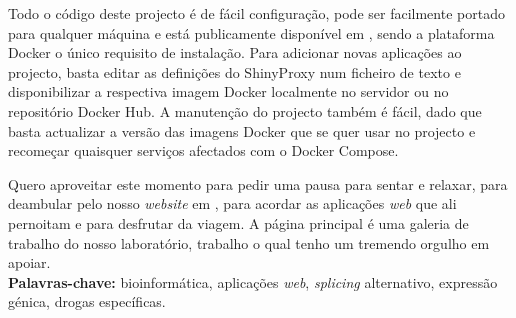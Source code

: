 Todo o código deste projecto é de fácil configuração, pode ser facilmente portado para qualquer máquina e está publicamente disponível em , sendo a plataforma Docker o único requisito de instalação. Para adicionar novas aplicações ao projecto, basta editar as definições do ShinyProxy num ficheiro de texto e disponibilizar a respectiva imagem Docker localmente no servidor ou no repositório Docker Hub. A manutenção do projecto também é fácil, dado que basta actualizar a versão das imagens Docker que se quer usar no projecto e recomeçar quaisquer serviços afectados com o Docker Compose.

Quero aproveitar este momento para pedir uma pausa para sentar e relaxar, para deambular pelo nosso \emph{website} em , para acordar as aplicações \emph{web} que ali pernoitam e para desfrutar da viagem. A página principal é uma galeria de trabalho do nosso laboratório, trabalho o qual tenho um tremendo orgulho em apoiar.\\

\textbf{Palavras-chave:} bioinformática, aplicações \emph{web}, \emph{splicing} alternativo, expressão génica, drogas específicas.

